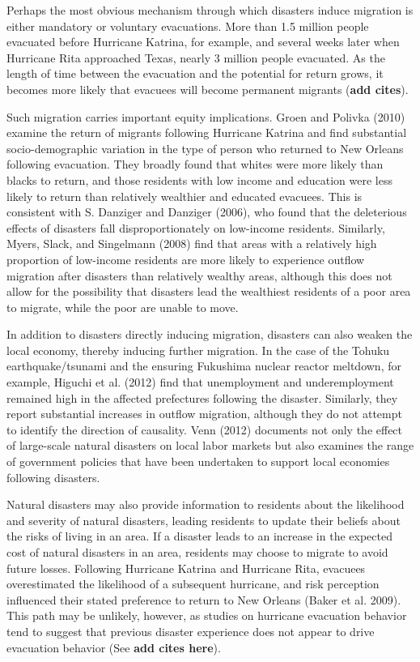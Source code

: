 \documentclass[]{article}
\begin{document}
Perhaps the most obvious mechanism through which disasters induce
migration is either mandatory or voluntary evacuations. More than 1.5
million people evacuated before Hurricane Katrina, for example, and
several weeks later when Hurricane Rita approached Texas, nearly 3
million people evacuated. As the length of time between the evacuation
and the potential for return grows, it becomes more likely that evacuees
will become permanent migrants (\textbf{add cites}).

Such migration carries important equity implications. Groen and Polivka
(2010) examine the return of migrants following Hurricane Katrina and
find substantial socio-demographic variation in the type of person who
returned to New Orleans following evacuation. They broadly found that
whites were more likely than blacks to return, and those residents with
low income and education were less likely to return than relatively
wealthier and educated evacuees. This is consistent with S. Danziger and
Danziger (2006), who found that the deleterious effects of disasters
fall disproportionately on low-income residents. Similarly, Myers,
Slack, and Singelmann (2008) find that areas with a relatively high
proportion of low-income residents are more likely to experience outflow
migration after disasters than relatively wealthy areas, although this
does not allow for the possibility that disasters lead the wealthiest
residents of a poor area to migrate, while the poor are unable to move.

In addition to disasters directly inducing migration, disasters can also
weaken the local economy, thereby inducing further migration. In the
case of the Tohuku earthquake/tsunami and the ensuring Fukushima nuclear
reactor meltdown, for example, Higuchi et al. (2012) find that
unemployment and underemployment remained high in the affected
prefectures following the disaster. Similarly, they report substantial
increases in outflow migration, although they do not attempt to identify
the direction of causality. Venn (2012) documents not only the effect of
large-scale natural disasters on local labor markets but also examines
the range of government policies that have been undertaken to support
local economies following disasters.

Natural disasters may also provide information to residents about the
likelihood and severity of natural disasters, leading residents to
update their beliefs about the risks of living in an area. If a disaster
leads to an increase in the expected cost of natural disasters in an
area, residents may choose to migrate to avoid future losses. Following
Hurricane Katrina and Hurricane Rita, evacuees overestimated the
likelihood of a subsequent hurricane, and risk perception influenced
their stated preference to return to New Orleans (Baker et al. 2009).
This path may be unlikely, however, as studies on hurricane evacuation
behavior tend to suggest that previous disaster experience does not
appear to drive evacuation behavior (See \textbf{add cites here}).
\end{document}
